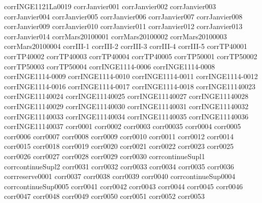 {corrINGE1121La0019}
{corrJanvier001}
{corrJanvier002}
{corrJanvier003}
{corrJanvier004}
{corrJanvier005}
{corrJanvier006}
{corrJanvier007}
{corrJanvier008}
{corrJanvier009}
{corrJanvier010}
{corrJanvier011}
{corrJanvier012}
{corrJanvier013}
{corrJanvier014}
{corrMars20100001}
{corrMars20100002}
{corrMars20100003}
{corrMars20100004}
{corrIII-1}
{corrIII-2}
{corrIII-3}
{corrIII-4}
{corrIII-5}
{corrTP40001}
{corrTP40002}
{corrTP40003}
{corrTP40004}
{corrTP40005}
{corrTP50001}
{corrTP50002}
{corrTP50003}
{corrTP50004}
{corrINGE1114-0006}
{corrINGE1114-0008}
{corrINGE1114-0009}
{corrINGE1114-0010}
{corrINGE1114-0011}
{corrINGE1114-0012}
{corrINGE1114-0016}
{corrINGE1114-0017}
{corrINGE1114-0018}
{corrINGE11140023}
{corrINGE11140024}
{corrINGE11140025}
{corrINGE11140027}
{corrINGE11140028}
{corrINGE11140029}
{corrINGE11140030}
{corrINGE11140031}
{corrINGE11140032}
{corrINGE11140033}
{corrINGE11140034}
{corrINGE11140035}
{corrINGE11140036}
{corrINGE11140037}
{corr0001}
{corr0002}
{corr0003}
{corr00035}
{corr0004}
{corr0005}
{corr0006}
{corr0007}
{corr0008}
{corr0009}
{corr0010}
{corr0011}
{corr0012}
{corr0014}
{corr0015}
{corr0018}
{corr0019}
{corr0020}
{corr0021}
{corr0022}
{corr0023}
{corr0025}
{corr0026}
{corr0027}
{corr0028}
{corr0029}
{corr0030}
{corrcontinueSupl1}
{corrcontinueSupl2}
{corr0031}
{corr0032}
{corr0033}
{corr0034}
{corr0035}
{corr0036}
{corrreserve0001}
{corr0037}
{corr0038}
{corr0039}
{corr0040}
{corrcontinueSup0004}
{corrcontinueSup0005}
{corr0041}
{corr0042}
{corr0043}
{corr0044}
{corr0045}
{corr0046}
{corr0047}
{corr0048}
{corr0049}
{corr0050}
{corr0051}
{corr0052}
{corr0053}
